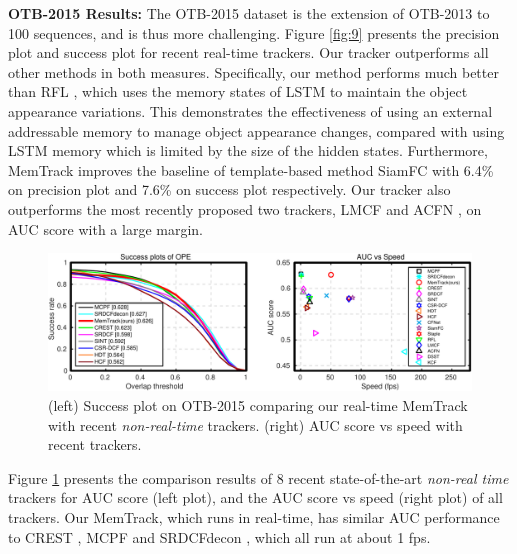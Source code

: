 \documentclass[runningheads]{llncs}
\begin{document}
\textbf{OTB-2015 Results:} The OTB-2015 \cite{Wu2015} dataset is the extension of OTB-2013 to 100 sequences, and is thus more challenging.
Figure \ref{fig:9} presents the precision plot and success plot for recent real-time trackers. Our tracker outperforms all other methods in both measures. Specifically, our method performs much better than RFL \cite{Yang2017}, which uses the memory states of LSTM to maintain the object appearance variations. This demonstrates the effectiveness of using an external addressable memory to manage object appearance changes, compared with using LSTM memory which is limited by the size of the hidden states.
Furthermore, MemTrack improves the baseline of template-based method SiamFC \cite{Bertinetto2016} with 6.4\% on precision plot and 7.6\% on success plot respectively. %
Our tracker also outperforms the most recently proposed two trackers, LMCF \cite{Wang2017} and ACFN \cite{Choi2017}, on AUC score with a large margin.
\begin{figure}[t]
	\begin{center}
		\includegraphics[width=0.85\linewidth]{figs/slow-tb100.pdf}
	\end{center}
	\caption{(left) Success plot on OTB-2015 comparing our real-time MemTrack with recent {\em non-real-time} trackers. (right) AUC score vs speed with recent trackers.}
	\label{fig:10}
\end{figure}
Figure \ref{fig:10} presents the comparison results of 8 recent state-of-the-art {\em non-real time} trackers for AUC score (left plot), and the AUC score vs speed (right plot) of all trackers.
Our MemTrack, which runs in real-time, has similar AUC performance to CREST \cite{Song2017}, MCPF \cite{Zhang2017} and SRDCFdecon \cite{Danelljan2016}, which all run at about 1 fps.
\end{document}
